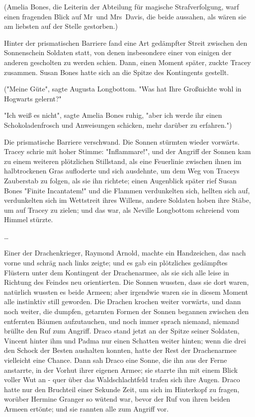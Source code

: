 {(Amelia Bones, die Leiterin der Abteilung für magische Strafverfolgung, warf einen fragenden Blick auf Mr~und Mrs~Davis, die beide aussahen, als wären sie am liebsten auf der Stelle gestorben.)

Hinter der prismatischen Barriere fand eine Art gedämpfter Streit zwischen den Sonnenschein Soldaten statt, von denen insbesondere einer von einigen der anderen gescholten zu werden schien. Dann, einen Moment später, zuckte Tracey zusammen. Susan Bones hatte sich an die Spitze des Kontingents gestellt.

("Meine Güte", sagte Augusta Longbottom. "Was hat Ihre Großnichte wohl in Hogwarts gelernt?"

"Ich weiß es nicht", sagte Amelia Bones ruhig, "aber ich werde ihr einen Schokoladenfrosch und Anweisungen schicken, mehr darüber zu erfahren.")

Die prismatische Barriere verschwand. Die Sonnen stürmten wieder vorwärts. Tracey schrie mit hoher Stimme: "Inflammare!", und der Angriff der Sonnen kam zu einem weiteren plötzlichen Stillstand, als eine Feuerlinie zwischen ihnen im halbtrockenen Gras aufloderte und sich ausdehnte, um dem Weg von Traceys Zauberstab zu folgen, als sie ihn richtete; einen Augenblick später rief Susan Bones "Finite Incantatem!" und die Flammen verdunkelten sich, hellten sich auf, verdunkelten sich im Wettstreit ihres Willens, andere Soldaten hoben ihre Stäbe, um auf Tracey zu zielen; und das war, als Neville Longbottom schreiend vom Himmel stürzte.

…

Einer der Drachenkrieger, Raymond Arnold, machte ein Handzeichen, das nach vorne und schräg nach links zeigte; und es gab ein plötzliches gedämpftes Flüstern unter dem Kontingent der Drachenarmee, als sie sich alle leise in Richtung des Feindes neu orientierten. Die Sonnen wussten, dass sie dort waren, natürlich wussten es beide Armeen; aber irgendwie waren sie in diesem Moment alle instinktiv still geworden. Die Drachen krochen weiter vorwärts, und dann noch weiter, die dumpfen, getarnten Formen der Sonnen begannen zwischen den entfernten Bäumen aufzutauchen, und noch immer sprach niemand, niemand brüllte den Ruf zum Angriff. Draco stand jetzt an der Spitze seiner Soldaten, Vincent hinter ihm und Padma nur einen Schatten weiter hinten; wenn die drei den Schock der Besten aushalten konnten, hatte der Rest der Drachenarmee vielleicht eine Chance. Dann sah Draco eine Sonne, die ihn aus der Ferne anstarrte, in der Vorhut ihrer eigenen Armee; sie starrte ihn mit einem Blick voller Wut an - quer über das Waldschlachtfeld trafen sich ihre Augen. Draco hatte nur den Bruchteil einer Sekunde Zeit, um sich im Hinterkopf zu fragen, worüber Hermine Granger so wütend war, bevor der Ruf von ihren beiden Armeen ertönte; und sie rannten alle zum Angriff vor.

}
